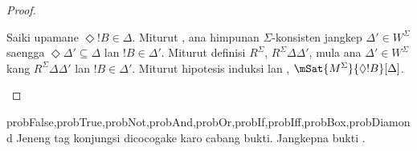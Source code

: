 \documentclass[../../../include/open-logic-section]{subfiles}
\begin{document}
\begin{proof}
\begin{enumerate}
{{{          Saiki upamane $\Diamond !B \in \Delta$. Miturut
          , ana himpunan $\Sigma$-konsisten
          jangkep $\Delta' \in W^\Sigma$ saengga
          $\Diamond \Delta' \subseteq \Delta$ lan $!B \in
          \Delta'$. Miturut
          definisi $R^\Sigma$, $R^\Sigma \Delta\Delta'$, mula ana
          $\Delta' \in W^\Sigma$ kang $R^\Sigma \Delta\Delta'$ lan
          $!B \in \Delta'$. Miturut hipotesis induksi lan
          , $\mSat{M^\Sigma}{\Diamond
            !B}[\Delta]$.}}}{}
  \end{enumerate}
\end{proof}

\begin{probtag}{probFalse,probTrue,probNot,probAnd,probOr,probIf,probIff,probBox,probDiamond}
  Jeneng tag konjungsi dicocogake karo cabang bukti. Jangkepna bukti .
\end{probtag}
\end{document}
